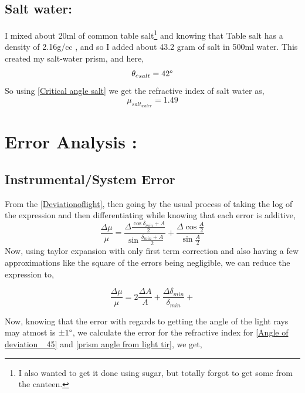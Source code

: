 \documentclass[twocolumn,11pt]{article}
\begin{document}
\subsection{Salt water:}
I mixed about 20ml of common table salt\footnote{I also wanted to get it done using sugar, but totally forgot to get some from the canteen.} and knowing that Table salt has a density of 2.16g/cc \cite{Density_of_salt}, and so I added about 43.2 gram of salt in 500ml water. This created my salt-water prism, and here,
\begin{equation}
    \label{Critical angle salt}
    {\theta_{c}}_{salt} = 42 \degree
\end{equation}
So using \eqref{Critical angle salt} we get the refractive index of salt water as,
\begin{equation}
    \label{refractive salt}
    \mu_{salt_{water}} = 1.49
\end{equation}

\section{Error Analysis :}
\subsection{Instrumental/System Error}

From the \eqref{Deviationoflight}, then going by the usual process of taking the log of the expression and then differentiating while knowing that each error is additive,
\begin{equation}
    \label{the system error exp}
    \frac{\Delta \mu}{\mu} = \frac{\Delta \frac{\cos{\delta_{min}+A}}{2}}{\sin{\frac{\delta_{min}+A}{2}}} + \frac{\Delta \cos{\frac{A}{2}}}{\sin{\frac{A}{2}}}
\end{equation}
Now, using taylor expansion with only first term correction and also having a few approximations like the square of the errors being negligible, we can reduce the expression to,

\begin{equation}
    \label{sys error simplified}
    \frac{\Delta \mu}{\mu}= 2\frac{\Delta A}{A} + \frac{\Delta \delta_{min}}{\delta_{min}} + 
\end{equation}

Now, knowing that the error with regards to getting the angle of the light rays may atmost is $\pm 1 \degree$, we calculate the error for the refractive index for \eqref{Angle of deviation _45} and \eqref{prism angle from light tir}, we get,
\end{document}
